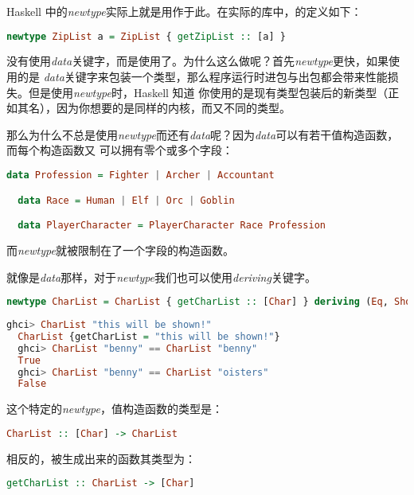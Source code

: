 \documentclass[./main.tex]{subfiles}
\begin{document}
Haskell 中的\textit{newtype}实际上就是用作于此。在实际的库中，的定义如下：

\begin{lstlisting}[language=Haskell]
  newtype ZipList a = ZipList { getZipList :: [a] }
\end{lstlisting}

没有使用\textit{data}关键字，而是使用了。为什么这么做呢？首先\textit{newtype}更快，如果使用的是
\textit{data}关键字来包装一个类型，那么程序运行时进包与出包都会带来性能损失。但是使用\textit{newtype}时，Haskell 知道
你使用的是现有类型包装后的新类型（正如其名），因为你想要的是同样的内核，而又不同的类型。

那么为什么不总是使用\textit{newtype}而还有\textit{data}呢？因为\textit{data}可以有若干值构造函数，而每个构造函数又
可以拥有零个或多个字段：

\begin{lstlisting}[language=Haskell]
  data Profession = Fighter | Archer | Accountant

  data Race = Human | Elf | Orc | Goblin

  data PlayerCharacter = PlayerCharacter Race Profession
\end{lstlisting}

而\textit{newtype}就被限制在了一个字段的构造函数。

就像是\textit{data}那样，对于\textit{newtype}我们也可以使用\textit{deriving}关键字。

\begin{lstlisting}[language=Haskell]
  newtype CharList = CharList { getCharList :: [Char] } deriving (Eq, Show)
\end{lstlisting}

\begin{lstlisting}[language=Haskell]
  ghci> CharList "this will be shown!"
  CharList {getCharList = "this will be shown!"}
  ghci> CharList "benny" == CharList "benny"
  True
  ghci> CharList "benny" == CharList "oisters"
  False
\end{lstlisting}

这个特定的\textit{newtype}，值构造函数的类型是：

\begin{lstlisting}[language=Haskell]
  CharList :: [Char] -> CharList
\end{lstlisting}

相反的，被生成出来的函数其类型为：

\begin{lstlisting}[language=Haskell]
  getCharList :: CharList -> [Char]
\end{lstlisting}
\end{document}
